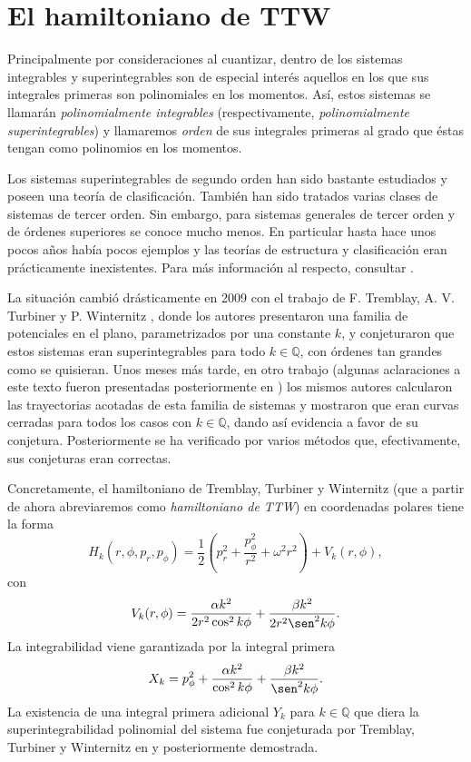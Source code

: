\documentclass[11pt,a4paper,twoside]{article}
\theoremstyle{definition} \newtheorem{defn}[thm]{Definición}
\theoremstyle{definition} \newtheorem{ejemplo}[thm]{Ejemplo}
\theoremstyle{definition} \newtheorem{ejercicio}[thm]{Ejercicio}
\theoremstyle{remark} \newtheorem*{obs}{Observación}
\def\QQ{\mathbb{Q}}
\begin{document}
\section{El hamiltoniano de TTW}
Principalmente por consideraciones al cuantizar, dentro de los sistemas integrables y superintegrables son de especial interés aquellos en los que sus integrales primeras son polinomiales en los momentos. Así, estos sistemas se llamarán \emph{polinomialmente integrables} (respectivamente, \emph{polinomialmente superintegrables}) y llamaremos \emph{orden} de sus integrales primeras al grado que éstas tengan como polinomios en los momentos. 

Los sistemas superintegrables de segundo orden han sido bastante estudiados y poseen una teoría de clasificación. También han sido tratados varias clases de sistemas de tercer orden. Sin embargo, para sistemas generales de tercer orden y de órdenes superiores se conoce mucho menos. En particular hasta hace unos pocos años había pocos ejemplos y las teorías de estructura y clasificación eran prácticamente inexistentes. Para más información al respecto, consultar \cite{miller}.
 

La situación cambió drásticamente en 2009 con el trabajo de F. Tremblay, A. V. Turbiner y P. Winternitz \cite{ttw1}, donde los autores presentaron una familia de potenciales en el plano, parametrizados por una constante $k$, y conjeturaron que estos sistemas eran superintegrables para todo $k\in \QQ$, con órdenes tan grandes como se quisieran. Unos meses más tarde, en otro trabajo \cite{ttw2} (algunas aclaraciones a este texto fueron presentadas posteriormente en \cite{burgos}) los mismos autores calcularon las trayectorias acotadas de esta familia de sistemas y mostraron que eran curvas cerradas para todos los casos con $k \in \QQ$, dando así evidencia a favor de su conjetura. Posteriormente se ha verificado por varios métodos que, efectivamente, sus conjeturas eran correctas.

Concretamente, el hamiltoniano de Tremblay, Turbiner y Winternitz (que a partir de ahora abreviaremos como \emph{hamiltoniano de TTW}) en coordenadas polares tiene la forma 
\begin{equation}
  H_k(r,\phi,p_r,p_{\phi})=\frac{1}{2}\left( p_r^2+\frac{p^2_{\phi}}{r^2} +\omega^2 r^2 \right) + V_k(r,\phi),
\end{equation}
con
\begin{equation}
  V_k(r,\phi)=\frac{\alpha k^2}{2r^2\cos^2 k\phi}+\frac{\beta k^2}{2r^2\sen^2 k\phi}.
  \label{eq:TTW}
\end{equation}
La integrabilidad viene garantizada por la integral primera
\begin{equation}
  X_k=p_{\phi}^2+\frac{\alpha k^2}{\cos^2 k\phi}+\frac{\beta k^2}{\sen^2 k\phi}.
  \label{eq:integralprimeraTTW}
\end{equation}
La existencia de una integral primera adicional $Y_{k}$ para $k\in \QQ$ que diera la superintegrabilidad polinomial del sistema fue conjeturada por Tremblay, Turbiner y Winternitz en \cite{ttw1} y posteriormente demostrada.
\end{document}
